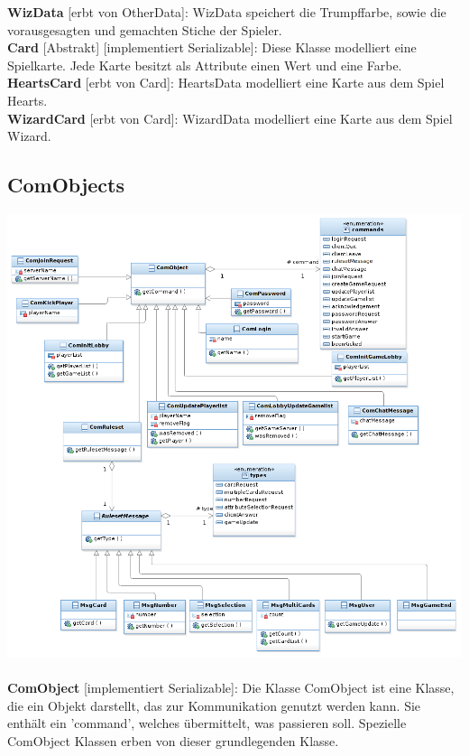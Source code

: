 \documentclass{article}
\begin{document}
\textbf{WizData} [erbt von OtherData]: WizData speichert die Trumpffarbe, sowie die vorausgesagten und gemachten Stiche der Spieler. \\
		
\textbf{Card} [Abstrakt] [implementiert Serializable]: Diese Klasse modelliert eine Spielkarte. Jede Karte besitzt als Attribute einen Wert und eine Farbe. \\
		
\textbf{HeartsCard} [erbt von Card]: HeartsData modelliert eine Karte aus dem Spiel Hearts. \\
		
\textbf{WizardCard} [erbt von Card]: WizardData modelliert eine Karte aus dem Spiel Wizard. \\

\subsection{ComObjects}
\includegraphics[width=\textwidth]{Entwurf_ComDiagram_1}
\\ \\
\textbf{ComObject} [implementiert Serializable]: Die Klasse ComObject ist eine Klasse, die ein Objekt darstellt, das zur Kommunikation genutzt werden kann. Sie enthält ein 'command', welches übermittelt, was passieren soll. Spezielle ComObject Klassen erben von dieser grundlegenden Klasse.\\
\end{document}
